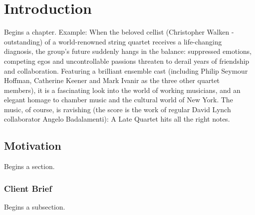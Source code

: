 %
%
\chapter{Introduction}
\label{chap:intro}

Begins a chapter. Example: When the beloved cellist (Christopher Walken - outstanding) of a world-renowned string quartet receives a life-changing diagnosis, the group's future suddenly hangs in the balance: suppressed emotions, competing egos and uncontrollable passions threaten to derail years of friendship and collaboration. Featuring a brilliant ensemble cast (including Philip Seymour Hoffman, Catherine Keener and Mark Ivanir as the three other quartet members), it is a fascinating look into the world of working musicians, and an elegant homage to chamber music and the cultural world of New York. The music, of course, is ravishing (the score is the work of regular David Lynch collaborator Angelo Badalamenti): A Late Quartet hits all the right notes.

\section{Motivation}
\label{sec:sec01}

Begins a section.

\subsection{Client Brief}
\label{subsec:subsec01}

Begins a subsection.


